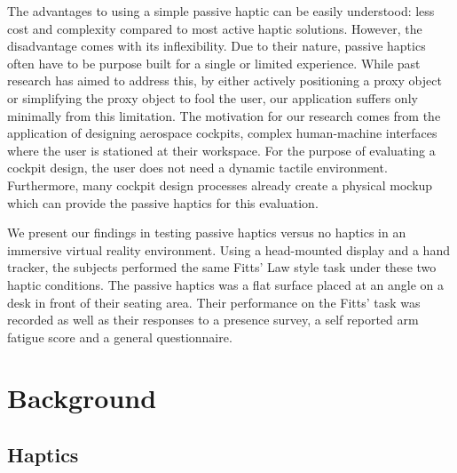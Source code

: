 The advantages to using a simple passive haptic can be easily understood: less cost and complexity compared to most active haptic solutions.
However, the disadvantage comes with its inflexibility.
Due to their nature, passive haptics often have to be purpose built for a single or limited experience.
While past research has aimed to address this, by either actively positioning a proxy object or simplifying the proxy object to fool the user, our application suffers only minimally from this limitation.
The motivation for our research comes from the application of designing aerospace cockpits, complex human-machine interfaces where the user is stationed at their workspace.
For the purpose of evaluating a cockpit design, the user does not need a dynamic tactile environment.
Furthermore, many cockpit design processes already create a physical mockup which can provide the passive haptics for this evaluation.

We present our findings in testing passive haptics versus no haptics in an immersive virtual reality environment.
Using a head-mounted display and a hand tracker, the subjects performed the same Fitts' Law style task under these two haptic conditions.
The passive haptics was a flat surface placed at an angle on a desk in front of their seating area.
Their performance on the Fitts' task was recorded as well as their responses to a presence survey, a self reported arm fatigue score and a general questionnaire.

\section{Background}

\subsection{Haptics}


